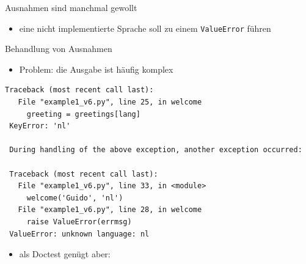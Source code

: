 \documentclass[t, utf8x, 10pt]{beamer}
\begin{document}
\begin{frame}{Ausnahmen sind manchmal gewollt}
 \begin{tiny}
  
 \end{tiny}

 \begin{itemize}
  \item eine nicht implementierte Sprache soll zu einem \texttt{ValueError} führen
 \end{itemize}
\end{frame}


\begin{frame}[fragile]{Behandlung von Ausnahmen}
 \begin{itemize}
  \item Problem: die Ausgabe ist häufig komplex
 \end{itemize}
 \begin{footnotesize}
  \begin{lstlisting}[language={}]
 Traceback (most recent call last):
   File "example1_v6.py", line 25, in welcome
     greeting = greetings[lang]
 KeyError: 'nl'

 During handling of the above exception, another exception occurred:

 Traceback (most recent call last):
   File "example1_v6.py", line 33, in <module>
     welcome('Guido', 'nl')
   File "example1_v6.py", line 28, in welcome
     raise ValueError(errmsg)
 ValueError: unknown language: nl
  \end{lstlisting}
 \end{footnotesize}
 \begin{itemize}
  \item als Doctest genügt aber:
 \end{itemize}
 \begin{footnotesize}
 
 \end{footnotesize}
\end{frame}
\end{document}
